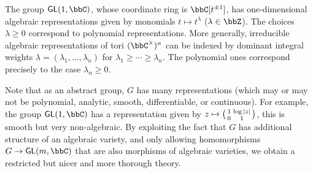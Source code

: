 \begin{example}
    The group $\mathsf{GL}(1,\bbC)$, whose
    coordinate ring is $\bbC[t^{\pm 1}]$, has one-dimensional algebraic representations given by monomials $t\mapsto
    t^\lambda$ ($\lambda\in \bbZ$). The choices $\lambda\geq 0$ correspond to
    polynomial representations. More generally, irreducible algebraic representations of
    tori $(\bbC^\times)^n$ can be indexed by dominant integral weights
    $\lambda=(\lambda_1,\ldots,\lambda_n)$ for $\lambda_1\geq \cdots\geq
    \lambda_n$. The polynomial ones correspond precisely to the case
    $\lambda_n\geq 0$.
\end{example}

Note that as an abstract group, $G$ has many representations (which may or
may not be polynomial, analytic, smooth, differentiable, or continuous). For
example, the group $\mathsf{GL}(1,\bbC)$ has a representation given by $z\mapsto
\left(\begin{smallmatrix} 1 & \log |z| \\ 0 & 1 \end{smallmatrix}\right)$, this is smooth but very non-algebraic. By exploiting the fact that $G$ has additional structure of
an algebraic variety, and only allowing homomorphisms $G\to
\mathsf{GL}(m,\bbC)$ that are also morphisms of algebraic varieties, we
obtain a restricted but nicer and more thorough theory.

